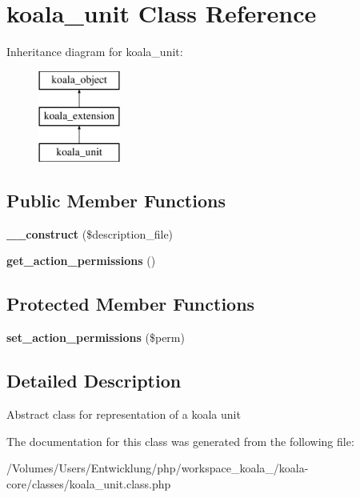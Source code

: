 \hypertarget{classkoala__unit}{
\section{koala\_\-unit Class Reference}
\label{classkoala__unit}
}
Inheritance diagram for koala\_\-unit:\begin{figure}[H]
\begin{center}
\leavevmode
\includegraphics[height=3.000000cm]{classkoala__unit}
\end{center}
\end{figure}
\subsection*{Public Member Functions}
\begin{DoxyCompactItemize}
\item 
\hypertarget{classkoala__unit_a7739bf93d7145259ebe0af5a6578e1e5}{
{\bfseries \_\-\_\-construct} (\$description\_\-file)}
\label{classkoala__unit_a7739bf93d7145259ebe0af5a6578e1e5}

\item 
\hypertarget{classkoala__unit_adcd63e66e2c3eeedf4b7ad2c791b3b9b}{
{\bfseries get\_\-action\_\-permissions} ()}
\label{classkoala__unit_adcd63e66e2c3eeedf4b7ad2c791b3b9b}

\end{DoxyCompactItemize}
\subsection*{Protected Member Functions}
\begin{DoxyCompactItemize}
\item 
\hypertarget{classkoala__unit_aa730a91c7c07ee0a7fb8e1b365b8e0c7}{
{\bfseries set\_\-action\_\-permissions} (\$perm)}
\label{classkoala__unit_aa730a91c7c07ee0a7fb8e1b365b8e0c7}

\end{DoxyCompactItemize}


\subsection{Detailed Description}
Abstract class for representation of a koala unit 

The documentation for this class was generated from the following file:\begin{DoxyCompactItemize}
\item 
/Volumes/Users/Entwicklung/php/workspace\_\-koala\_/koala-\/core/classes/koala\_\-unit.class.php\end{DoxyCompactItemize}

